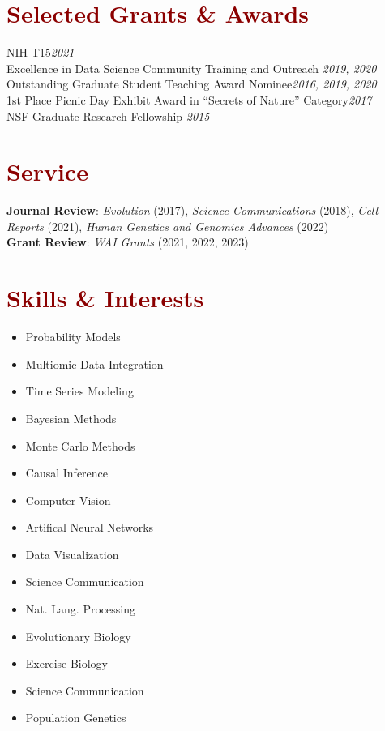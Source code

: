 \documentclass[11pt,margin,line]{resume}
\begin{document}
\begin{resume}
\section{\large\textcolor{DarkRed}{Selected Grants \& Awards}}
NIH T15\hfill \emph{2021}\\
Excellence in Data Science Community Training and Outreach \hfill \emph{2019, 2020}\\
Outstanding Graduate Student Teaching Award Nominee\hfill \emph{2016, 2019, 2020}\\
1st Place Picnic Day Exhibit Award in “Secrets of Nature” Category\hfill \emph{2017}\\
NSF Graduate Research Fellowship \hfill \emph{2015}\\

\vspace{-5mm}
\section{\large\textcolor{DarkRed}{Service}}
\textbf{Journal Review}: \emph{Evolution} (2017),  \emph{Science Communications} (2018),  \emph{Cell Reports} (2021), \emph{Human Genetics and Genomics Advances} (2022)\\
\textbf{Grant Review}: \emph{WAI Grants} (2021,  2022,  2023)

\section{\large\textcolor{DarkRed}{Skills \& Interests}}


\vspace{-0.0mm}
\begin{multicols}{3}
    \begin{itemize}
    \setlength\itemsep{-0.2em}
         \item Probability Models
         \item Multiomic Data Integration
	\item Time Series Modeling
	\item Bayesian Methods
         \item Monte Carlo Methods
         \item Causal Inference
         \item Computer Vision
         \item Artifical Neural Networks
         \item Data Visualization
         \item Science Communication
         \item Nat. Lang. Processing
         \item Evolutionary Biology
         \item Exercise Biology
         \item Science Communication
         \item Population Genetics
         
    \end{itemize}
    \end{multicols}\vspace{-4.5mm}


\end{resume}
\end{document}
